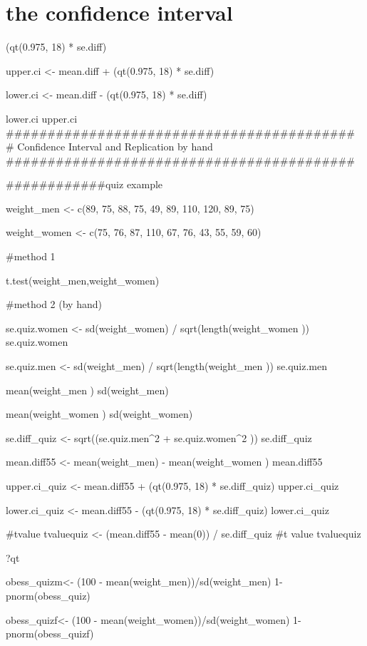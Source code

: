 \documentclass[
]{article}
\begin{document}
\hypertarget{the-confidence-interval}{%
\section{the confidence interval}\label{the-confidence-interval}}

(qt(0.975, 18) * se.diff)

upper.ci \textless- mean.diff + (qt(0.975, 18) * se.diff)

lower.ci \textless- mean.diff - (qt(0.975, 18) * se.diff)

lower.ci upper.ci
\#\#\#\#\#\#\#\#\#\#\#\#\#\#\#\#\#\#\#\#\#\#\#\#\#\#\#\#\#\#\#\#\#\#\#\#\#\#\#\#\#\#
\# Confidence Interval and Replication by hand
\#\#\#\#\#\#\#\#\#\#\#\#\#\#\#\#\#\#\#\#\#\#\#\#\#\#\#\#\#\#\#\#\#\#\#\#\#\#\#\#\#\#

\#\#\#\#\#\#\#\#\#\#\#\#quiz example

weight\_men \textless- c(89, 75, 88, 75, 49, 89, 110, 120, 89, 75)

weight\_women \textless- c(75, 76, 87, 110, 67, 76, 43, 55, 59, 60)

\#method 1

t.test(weight\_men,weight\_women)

\#method 2 (by hand)

se.quiz.women \textless- sd(weight\_women) / sqrt(length(weight\_women
)) se.quiz.women

se.quiz.men \textless- sd(weight\_men) / sqrt(length(weight\_men ))
se.quiz.men

mean(weight\_men ) sd(weight\_men)

mean(weight\_women ) sd(weight\_women)

se.diff\_quiz \textless- sqrt((se.quiz.men\^{}2 + se.quiz.women\^{}2 ))
se.diff\_quiz

mean.diff55 \textless- mean(weight\_men) - mean(weight\_women )
mean.diff55

upper.ci\_quiz \textless- mean.diff55 + (qt(0.975, 18) * se.diff\_quiz)
upper.ci\_quiz

lower.ci\_quiz \textless- mean.diff55 - (qt(0.975, 18) * se.diff\_quiz)
lower.ci\_quiz

\#tvalue tvaluequiz \textless- (mean.diff55 - mean(0)) / se.diff\_quiz
\#t value tvaluequiz

?qt

obess\_quizm\textless- (100 - mean(weight\_men))/sd(weight\_men)
1-pnorm(obess\_quiz)

obess\_quizf\textless- (100 - mean(weight\_women))/sd(weight\_women)
1-pnorm(obess\_quizf)
\end{document}
